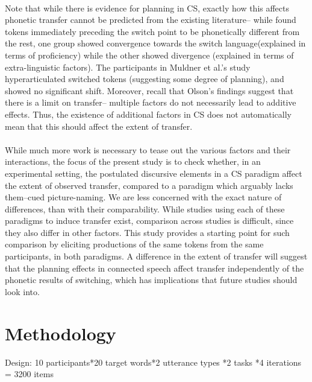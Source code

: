 \documentclass[11pt]{article}
\begin{document}
\paragraph{}Note that while there is evidence for planning in CS, exactly how this affects phonetic transfer cannot be predicted from the existing literature-- while \cite{bullock2009trying} found tokens immediately preceding the switch point to be phonetically different from the rest, one group showed convergence towards the switch language(explained in terms of proficiency) while the other showed divergence (explained in terms of extra-linguistic factors). The participants in Muldner et al.'s \citeyear{muldner2019phonetics} study hyperarticulated switched tokens (suggesting some degree of planning), and showed no significant shift. Moreover, recall that Olson's \citeyear{olson2016role} findings suggest that there is a limit on transfer-- multiple factors do not necessarily lead to additive effects. Thus, the existence of additional factors in CS does not automatically mean that this should affect the extent of transfer. 

\paragraph{}While much more work is necessary to tease out the various factors and their interactions, the focus of the present study is to check whether, in an experimental setting, the postulated discursive elements in a CS paradigm affect the extent of observed transfer, compared to a paradigm which arguably lacks them--cued picture-naming. We are less concerned with the exact nature of differences, than with their comparability. While studies using each of these paradigms to induce transfer exist, comparison across studies is difficult, since they also differ in other factors. This study provides a starting point for such comparison by eliciting productions of the same tokens from the same participants, in both paradigms. A difference in the extent of transfer will suggest that the planning effects in connected speech affect transfer independently of the phonetic results of switching, which has implications that future studies should look into. 

\section{Methodology} %
Design: 10 participants*20 target words*2 utterance types *2 tasks *4 iterations = 3200 items
\end{document}
